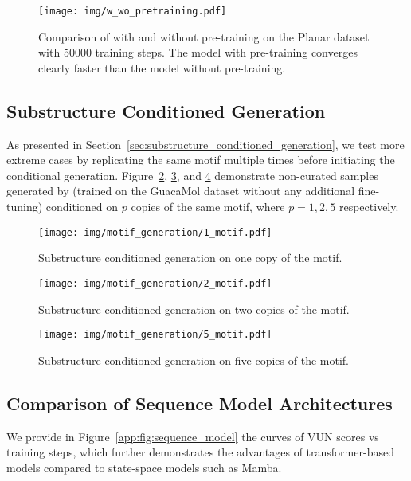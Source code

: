 \begin{figure}
    \centering
    \texttt{[image: img/w\_wo\_pretraining.pdf]}
    \caption{Comparison of \method{} with and without pre-training on the Planar dataset with 50000 training steps. The model with pre-training converges clearly faster than the model without pre-training.}
    \label{app:fig:with_vs_without_pretraining}
\end{figure}

\subsection{Substructure Conditioned Generation}\label{app:sec:substructure_conditioned_generation}

As presented in Section~\ref{sec:substructure_conditioned_generation}, we test more extreme cases by replicating the same motif multiple times before initiating the conditional generation. Figure~\ref{app:fig:1_motif_samples}, \ref{app:fig:2_motif_samples}, and \ref{app:fig:5_motif_samples} demonstrate non-curated samples generated by \method{} (trained on the GuacaMol dataset without any additional fine-tuning) conditioned on $p$ copies of the same motif, where $p=1, 2, 5$ respectively.

\begin{figure}[ht]
    \centering
    \texttt{[image: img/motif\_generation/1\_motif.pdf]}
    \caption{Substructure conditioned generation on one copy of the motif.}
    \label{app:fig:1_motif_samples}
\end{figure}

\begin{figure}[ht]
    \centering
    \texttt{[image: img/motif\_generation/2\_motif.pdf]}
    \caption{Substructure conditioned generation on two copies of the motif.}
    \label{app:fig:2_motif_samples}
\end{figure}

\begin{figure}[ht]
    \centering
    \texttt{[image: img/motif\_generation/5\_motif.pdf]}
    \caption{Substructure conditioned generation on five copies of the motif.}
    \label{app:fig:5_motif_samples}
\end{figure}

\subsection{Comparison of Sequence Model Architectures}
We provide in Figure~\ref{app:fig:sequence_model} the curves of VUN scores vs training steps, which further demonstrates the advantages of transformer-based models compared to state-space models such as Mamba.

